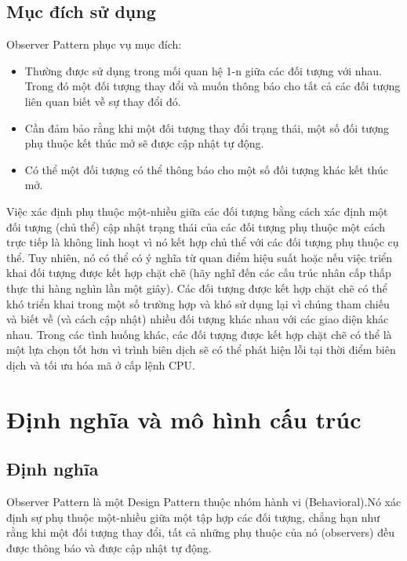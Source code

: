 \subsection{Mục đích sử dụng}
Observer Pattern phục vụ mục đích:
\begin{itemize}
    \item Thường được sử dụng trong mối quan hệ 1-n giữa các đối tượng với nhau. Trong đó một đối tượng thay đổi và muốn thông báo cho tất cả các đối tượng liên quan biết về sự thay đổi đó.
    \item Cần đảm bảo rằng khi một đối tượng thay đổi trạng thái, một số đối tượng phụ thuộc kết thúc mở sẽ được cập nhật tự động.
    \item Có thể một đối tượng có thể thông báo cho một số đối tượng khác kết thúc mở.
    
\end{itemize}
Việc xác định phụ thuộc một-nhiều giữa các đối tượng bằng cách xác định một đối tượng (chủ thể) cập nhật trạng thái của các đối tượng phụ thuộc một cách trực tiếp là không linh hoạt vì nó kết hợp chủ thể với các đối tượng phụ thuộc cụ thể. Tuy nhiên, nó có thể có ý nghĩa từ quan điểm hiệu suất hoặc nếu việc triển khai đối tượng được kết hợp chặt chẽ (hãy nghĩ đến các cấu trúc nhân cấp thấp thực thi hàng nghìn lần một giây). Các đối tượng được kết hợp chặt chẽ có thể khó triển khai trong một số trường hợp và khó sử dụng lại vì chúng tham chiếu và biết về (và cách cập nhật) nhiều đối tượng khác nhau với các giao diện khác nhau. Trong các tình huống khác, các đối tượng được kết hợp chặt chẽ có thể là một lựa chọn tốt hơn vì trình biên dịch sẽ có thể phát hiện lỗi tại thời điểm biên dịch và tối ưu hóa mã ở cấp lệnh CPU.
 
\section{Định nghĩa và mô hình cấu trúc}
\subsection{Định nghĩa}
Observer Pattern là một Design Pattern thuộc nhóm hành vi (Behavioral).Nó xác định sự phụ thuộc một-nhiều giữa một tập hợp các đối tượng, chẳng hạn như rằng khi một đối tượng thay đổi, tất cả những phụ thuộc của nó (observers) đều được thông báo và được cập nhật tự động.
